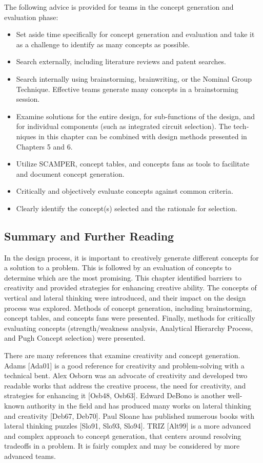 The following advice is provided for teams in the concept generation and
evaluation phase:

\begin{itemize}
\item
  Set aside time specifically for concept generation and evaluation and
  take it as a challenge to identify as many concepts as possible.
\item
  Search externally, including literature reviews and patent searches.
\item
  Search internally using brainstorming, brainwriting, or the Nominal
  Group Technique. Effective teams generate many concepts in a
  brainstorming session.
\item
  Examine solutions for the entire design, for sub-functions of the
  design, and for individual components (such as integrated circuit
  selection). The tech­niques in this chapter can be combined with design
  methods presented in Chapters 5 and 6.
\item
  Utilize SCAMPER, concept tables, and concepts fans as tools to
  facilitate and document concept generation.
\item
  Critically and objectively evaluate concepts against common criteria.
\item
  Clearly identify the concept(s) selected and the rationale for
  selection.
\end{itemize}

\subsection{Summary and Further
Reading}\label{summary-and-further-reading}

In the design process, it is important to creatively generate different
concepts for a solution to a problem. This is followed by an evaluation
of concepts to determine which are the most promising. This chapter
identified barriers to creativity and provided strategies for enhancing
creative ability. The concepts of vertical and lateral thinking were
introduced, and their im­pact on the design process was explored. Methods
of concept generation, including brainstorming, concept tables, and
concepts fans were presented. Finally, methods for critically evaluating
concepts (strength/weakness analysis, Analytical Hierarchy Process, and
Pugh Concept selection) were presented.

There are many references that examine creativity and concept
generation. Adams {[}Ada01{]} is a good reference for creativity and
problem-solving with a technical bent. Alex Os­born was an advocate of
creativity and developed two readable works that address the creative
process, the need for creativity, and strategies for enhancing it
{[}Osb48, Osb63{]}. Ed­ward DeBono is another well-known authority in the
field and has produced many works on lateral thinking and creativity
{[}Deb67, Deb70{]}. Paul Sloane has published numerous books with
lateral thinking puzzles {[}Slo91, Slo93, Slo94{]}. TRIZ {[}Alt99{]} is
a more advanced and complex approach to concept generation, that centers
around resolving tradeoffs in a problem. It is fairly complex and may be
considered by more advanced teams.

